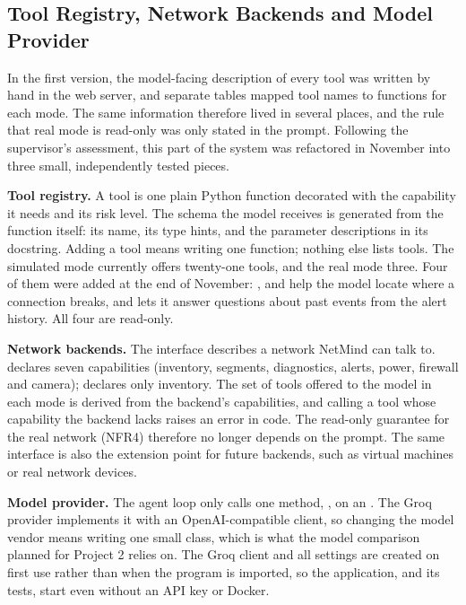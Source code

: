\subsection{Tool Registry, Network Backends and Model Provider}

In the first version, the model-facing description of every tool was written
by hand in the web server, and separate tables mapped tool names to functions
for each mode. The same information therefore lived in several places, and
the rule that real mode is read-only was only stated in the prompt. Following
the supervisor's assessment, this part of the system was refactored in
November into three small, independently tested pieces.

\textbf{Tool registry.} A tool is one plain Python function decorated with
the capability it needs and its risk level. The schema the model receives is
generated from the function itself: its name, its type hints, and the
parameter descriptions in its docstring. Adding a tool means writing one
function; nothing else lists tools. The simulated mode currently offers
twenty-one tools, and the real mode three. Four of them were added at the end
of November: ,  and
 help the model locate where a connection
breaks, and  lets it answer questions about past events
from the alert history. All four are read-only.

\textbf{Network backends.} The  interface describes a
network NetMind can talk to.  declares seven
capabilities (inventory, segments, diagnostics, alerts, power, firewall and
camera);
 declares only inventory. The set of tools offered to the
model in each mode is derived from the backend's capabilities, and calling a
tool whose capability the backend lacks raises an error in code. The
read-only guarantee for the real network (NFR4) therefore no longer depends
on the prompt. The same interface is also the extension point for future
backends, such as virtual machines or real network devices.

\textbf{Model provider.} The agent loop only calls one method,
, on an . The Groq provider
implements it with an OpenAI-compatible client, so changing the model vendor
means writing one small class, which is what the model comparison planned for
Project 2 relies on. The Groq client and all settings are created on first
use rather than when the program is imported, so the application, and its
tests, start even without an API key or Docker.


